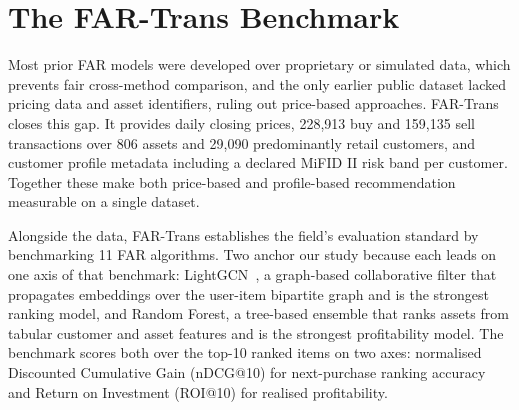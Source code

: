\section{The FAR-Trans Benchmark}
\label{sec:prelim}

Most prior FAR models were developed over proprietary or simulated data, which prevents fair cross-method comparison, and the only earlier public dataset lacked pricing data and asset identifiers, ruling out price-based approaches. FAR-Trans~\cite{sanzcruzado2024fartransinvestmentdatasetfinancial} closes this gap. It provides daily closing prices, 228{,}913 buy and 159{,}135 sell transactions over 806 assets and 29{,}090 predominantly retail customers, and customer profile metadata including a declared MiFID II risk band per customer. Together these make both price-based and profile-based recommendation measurable on a single dataset.

Alongside the data, FAR-Trans establishes the field's evaluation standard by benchmarking 11 FAR algorithms. Two anchor our study because each leads on one axis of that benchmark: LightGCN~\cite{he2020lightgcnsimplifyingpoweringgraph}, a graph-based collaborative filter that propagates embeddings over the user-item bipartite graph and is the strongest ranking model, and Random Forest, a tree-based ensemble that ranks assets from tabular customer and asset features and is the strongest profitability model. The benchmark scores both over the top-10 ranked items on two axes: normalised Discounted Cumulative Gain (nDCG@10) for next-purchase ranking accuracy and Return on Investment (ROI@10) for realised profitability.
